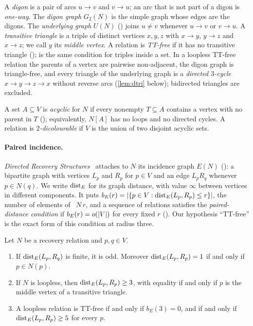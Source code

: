 A \emph{digon} is a pair of arcs $u\to v$ and $v\to u$; an arc that is not part of a digon is \emph{one-way}. The
\emph{digon graph} $G_2(N)$ is the simple graph whose edges are the digons. The \emph{underlying graph} $U(N)$
() joins $u\ne v$ whenever $u\to v$ or $v\to u$. A \emph{transitive triangle} is a triple of distinct
vertices $x,y,z$ with $x\to y$, $y\to z$ and $x\to z$; we call $y$ its \emph{middle vertex}. A relation is
\emph{TT-free} if it has no transitive triangle ();  is the same condition for triples
inside a set. In a loopless TT-free relation the parents of a vertex are pairwise non-adjacent, the digon graph is
triangle-free, and every triangle of the underlying graph is a \emph{directed $3$-cycle} $x\to y\to z\to x$ without
reverse arcs (\cref{lem:dtri} below); bidirected triangles are excluded.

A set $A\subseteq V$ is \emph{acyclic} for $N$ if every nonempty $T\subseteq A$ contains a vertex with no parent in
$T$ (); equivalently, $N[A]$ has no loops and no directed cycles. A relation is
\emph{$2$-dicolourable} if $V$ is the union of two disjoint acyclic sets.

\paragraph{Paired incidence.} \emph{Directed Recovery Structures}~\cite[Definition~2.3]{DirectedRecovery2026} attaches
to $N$ its incidence graph $E(N)$ (): a bipartite graph with vertices $L_p$
and $R_p$ for $p\in V$ and an edge $L_pR_q$ whenever $p\in N(q)$. We write $\operatorname{dist}_E$ for its graph distance, with
value $\infty$ between vertices in different components. It puts $b_E(r)=\lvert \{p\in V:\operatorname{dist}_E(L_p,R_p)\le r\} \rvert$, the
number of elements of ~$N\,r$, and a sequence of relations satisfies the
\emph{paired-distance condition} if $b_E(r)=o(\lvert V \rvert)$ for every fixed $r$
(). Our hypothesis ``TT-free'' is the exact form of this condition
at radius three.

\begin{lemma}\label{lem:tt-paired}
Let $N$ be a recovery relation and $p,q\in V$.
\begin{enumerate}[label=(\alph*)]
\item\label{it:pd-odd} If $\operatorname{dist}_E(L_p,R_q)$ is finite, it is odd. Moreover $\operatorname{dist}_E(L_p,R_p)=1$ if and only if
$p\in N(p)$.
\item\label{it:pd-three} If $N$ is loopless, then $\operatorname{dist}_E(L_p,R_p)\ge3$, with equality if and only if $p$ is the
middle vertex of a transitive triangle.
\item\label{it:pd-five} A loopless relation is TT-free if and only if $b_E(3)=0$, and if and only if
$\operatorname{dist}_E(L_p,R_p)\ge5$ for every $p$.
\end{enumerate}
\end{lemma}

